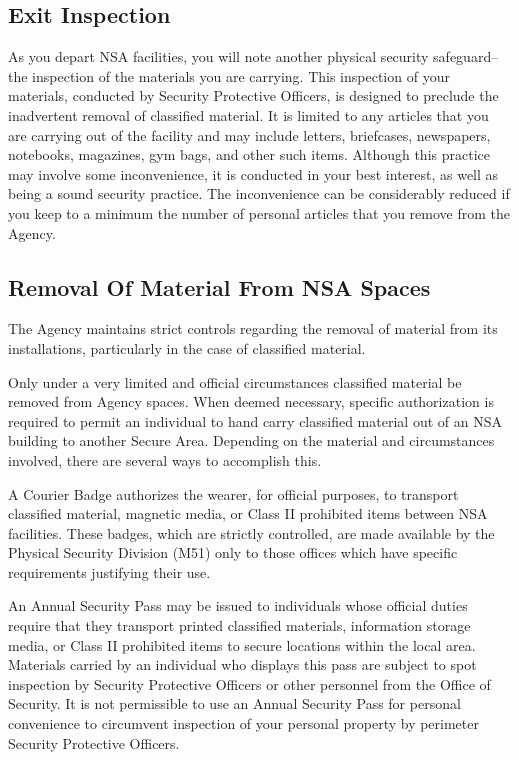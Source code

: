 \documentclass[a4]{article}
\begin{document}
\subsection{Exit Inspection}

As you depart NSA facilities, you will note another physical security
safeguard--the inspection of the materials you are carrying.  This inspection
of your materials, conducted by Security Protective Officers, is designed to
preclude the inadvertent removal of classified material.  It is limited to any
articles that you are carrying out of the facility and may include letters,
briefcases, newspapers, notebooks, magazines, gym bags, and other such items.
Although this practice may involve some inconvenience, it is conducted in your
best interest, as well as being a sound security practice.  The inconvenience
can be considerably reduced if you keep to a minimum the number of personal
articles that you remove from the Agency.

\subsection{Removal Of Material From NSA Spaces}

The Agency maintains strict controls regarding the removal of material from its
installations, particularly in the case of classified material.

Only under a very limited and official circumstances classified material be
removed from Agency spaces.  When deemed necessary, specific authorization is
required to permit an individual to hand carry classified material out of an
NSA building to another Secure Area.  Depending on the material and
circumstances involved, there are several ways to accomplish this.

A Courier Badge authorizes the wearer, for official purposes, to transport
classified material, magnetic media, or Class II prohibited items between NSA
facilities.  These badges, which are strictly controlled, are made available by
the Physical Security Division (M51) only to those offices which have specific
requirements justifying their use.

An Annual Security Pass may be issued to individuals whose official duties
require that they transport printed classified materials, information storage
media, or Class II prohibited items to secure locations within the local area.
Materials carried by an individual who displays this pass are subject to spot
inspection by Security Protective Officers or other personnel from the Office
of Security.  It is not permissible to use an Annual Security Pass for personal
convenience to circumvent inspection of your personal property by perimeter
Security Protective Officers.
\end{document}
